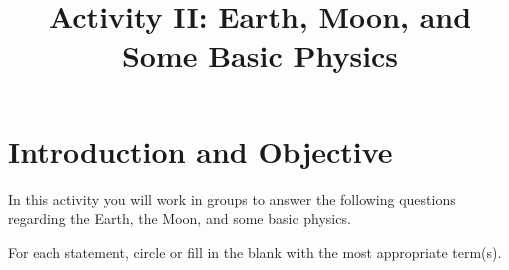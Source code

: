 \documentclass[12pt]{article}
\begin{document}
\title{Activity II: Earth, Moon, and Some Basic Physics}

\maketitle

\section{Introduction and Objective}

In this activity you will work in groups to answer the following questions regarding the Earth, the Moon, and some basic physics.\newline
{}

For each statement, circle or fill in the blank with the most appropriate term(s).\newline
\end{document}
